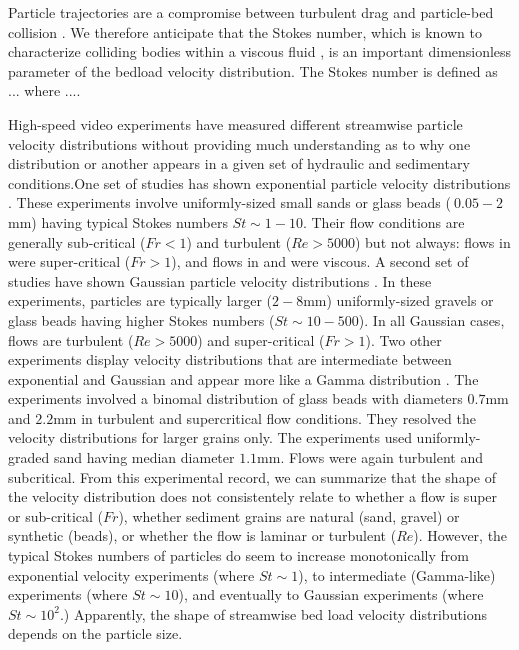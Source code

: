 Particle trajectories are a compromise between turbulent drag and particle-bed collision \citep{Wiberg1985}. We therefore anticipate that the Stokes number, which is known to characterize colliding bodies within a viscous fluid \citep{}, is an important dimensionless parameter of the bedload velocity distribution.
The Stokes number is defined as ... where ....

High-speed video experiments have measured different streamwise particle velocity distributions without providing much understanding as to why one distribution or another appears in a given set of hydraulic and sedimentary conditions.One set of studies has shown exponential particle velocity distributions \citep{Charru2004,Lajeunesse2010,Roseberry2012,Seizilles2014,Fathel2015,Fathel2016}.
These experiments involve uniformly-sized small sands or glass beads ($~0.05-2$mm) having typical Stokes numbers $St \sim 1-10$. Their flow conditions are generally sub-critical ($Fr<1$) and turbulent ($Re>5000$) but not always: flows in \citet{Lajeunesse2010} were super-critical ($Fr>1$), and flows in \citet{Charru2004} and \citet{Seizilles2014} were viscous.
A second set of studies have shown Gaussian particle velocity distributions \citep{Ancey2014,Heyman2016,Martin2012}. In these experiments, particles are typically larger ($2-8$mm) uniformly-sized gravels or glass beads having higher Stokes numbers ($St \sim 10-500$). In all Gaussian cases, flows are turbulent ($Re>5000$) and super-critical ($Fr>1$).
Two other experiments display velocity distributions that are intermediate between exponential and Gaussian and appear more like a Gamma distribution \citep{Houssais2012, Liu2019}. The \citet{Houssais2012} experiments involved a binomal distribution of glass beads with diameters $0.7$mm and $2.2$mm in turbulent and supercritical flow conditions. They resolved the velocity distributions for larger grains only. The \citet{Liu2019} experiments used uniformly-graded sand having median diameter $1.1$mm. Flows were again turbulent and subcritical.
From this experimental record, we can summarize that the shape of the velocity distribution does not consistentely relate to whether a flow is super or sub-critical ($Fr$), whether sediment grains are natural (sand, gravel) or synthetic (beads), or whether the flow is laminar or turbulent ($Re$). However, the typical Stokes numbers of particles do seem to increase monotonically from exponential velocity experiments (where $St \sim 1$), to intermediate (Gamma-like) experiments (where $St \sim 10$), and eventually to Gaussian experiments (where $St \sim 10^2$.) Apparently, the shape of streamwise bed load velocity distributions depends on the particle size.

